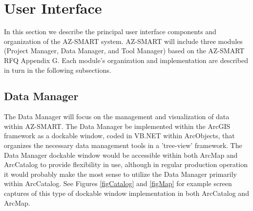 \section{User Interface}

In this section we describe the principal user interface components
and organization of the AZ-SMART system.  AZ-SMART will include
three modules (Project Manager, Data Manager, and Tool Manager)
based on the AZ-SMART RFQ Appendix G. Each module's organization and
implementation are described in turn in the following subsections.



\subsection{Data Manager}

The Data Manager will focus on the management and visualization of
data within AZ-SMART.  The Data Manager be implemented within the
ArcGIS framework as a dockable window, coded in VB.NET within ArcObjects,
that organizes the necessary data management tools in a
'tree-view' framework.  The Data Manager dockable window would be
accessible within both ArcMap and ArcCatalog to provide flexibility
in use, although in regular production operation it would probably
make the most sense to utilize the Data Manager primarily within
ArcCatalog.  See Figures \ref{figCatalog} and \ref{figMap} for example 
screen captures
of this type of dockable window implementation in both ArcCatalog
and ArcMap.


